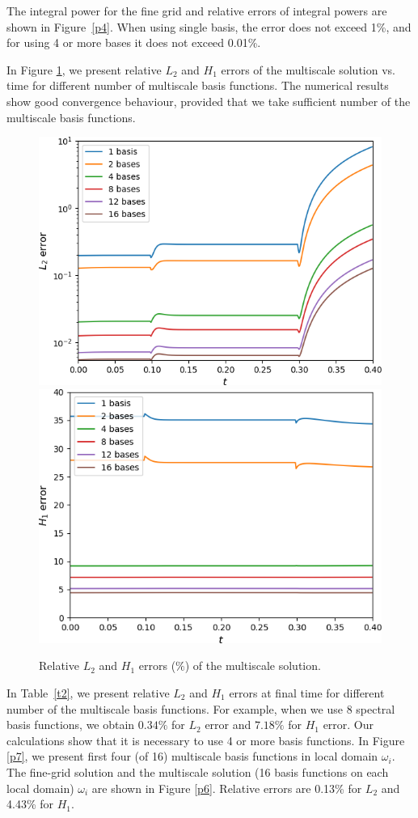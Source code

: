 \documentclass[10pt]{article}
\begin{document}
The integral power for the fine grid and relative errors of integral powers are shown in Figure~\ref{p4}. 
When using single basis, the error does not exceed 1\%, and for using 4 or more bases it does not exceed 0.01\%.

In Figure \ref{p5}, we present relative $L_2$ and $H_1$ errors of the multiscale solution vs. time for different number of multiscale basis functions.
The numerical results show good convergence behaviour, provided that we take sufficient number of the multiscale basis functions.

\begin{figure}[h!]
\centering
\includegraphics[width=0.45\linewidth]{L2_log.png} 
\hspace{2em}
\includegraphics[width=0.45\linewidth]{H1.png} 
\caption{Relative $L_2$ and $H_1$ errors ($\%$) of the multiscale solution.}
\label{p5}
\end{figure} 

In Table~\ref{t2}, we present relative $L_2$ and $H_1$ errors at final time for different number of the multiscale basis functions.
For example, when we use 8 spectral basis functions, we obtain $0.34\%$ for $L_2$ error and $7.18\%$ for $H_1$ error. 
Our calculations show that it is necessary to use 4 or more basis functions. 
In Figure \ref{p7}, we present first four (of 16) multiscale basis functions in local domain $\omega_i$.
The fine-grid solution and the multiscale solution (16 basis functions on each local domain) $\omega_i$ are shown in Figure \ref{p6}. Relative errors are 0.13\% for $L_2$ and 4.43\% for $H_1$. 
\end{document}

